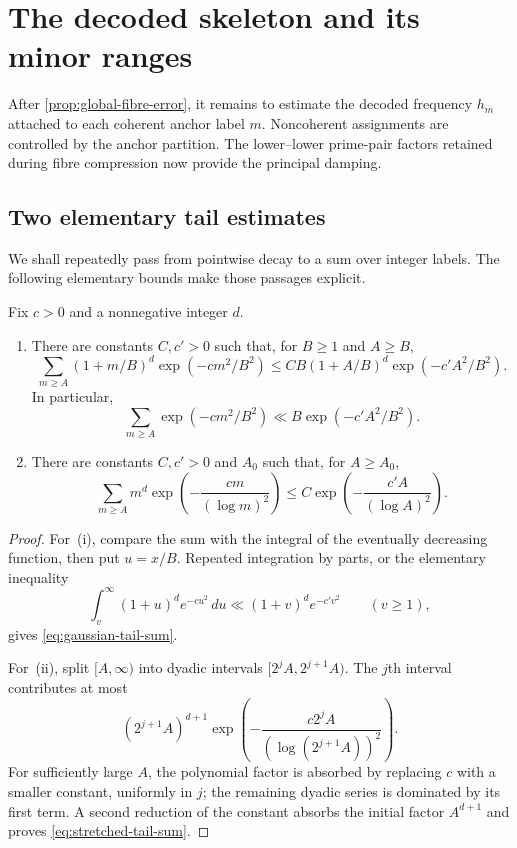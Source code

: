 \section{The decoded skeleton and its minor ranges}
\label{sec:decoded-skeleton}

After \cref{prop:global-fibre-error}, it remains to estimate the decoded frequency $h_m$ attached to each coherent anchor label $m$.  Noncoherent assignments are controlled by the anchor partition.  The lower--lower prime-pair factors retained during fibre compression now provide the principal damping.

\subsection{Two elementary tail estimates}

We shall repeatedly pass from pointwise decay to a sum over integer labels.  The following elementary bounds make those passages explicit.

\begin{lemma}
\label{lem:tail-summation}
Fix $c>0$ and a nonnegative integer $d$.
\begin{enumerate}[label=(\roman*)]
\item There are constants $C,c'>0$ such that, for $B\geq1$ and $A\geq B$,
\begin{equation}
\label{eq:gaussian-tail-sum}
 \sum_{m\geq A}(1+m/B)^d\exp(-cm^2/B^2)
 \leq CB(1+A/B)^d\exp(-c'A^2/B^2).
\end{equation}
In particular,
\[
 \sum_{m\geq A}\exp(-cm^2/B^2)
 \ll B\exp(-c'A^2/B^2).
\]
\item There are constants $C,c'>0$ and $A_0$ such that, for $A\geq A_0$,
\begin{equation}
\label{eq:stretched-tail-sum}
 \sum_{m\geq A}m^d\exp\left(-\frac{cm}{(\log m)^2}\right)
 \leq C\exp\left(-\frac{c'A}{(\log A)^2}\right).
\end{equation}
\end{enumerate}
\end{lemma}

\begin{proof}
For~(i), compare the sum with the integral of the eventually decreasing function, then put $u=x/B$.  Repeated integration by parts, or the elementary inequality
\[
 \int_v^\infty(1+u)^d e^{-cu^2}\,du
 \ll(1+v)^d e^{-c'v^2}
 \qquad(v\geq1),
\]
gives \cref{eq:gaussian-tail-sum}.

For~(ii), split $[A,\infty)$ into dyadic intervals $[2^jA,2^{j+1}A)$.  The $j$th interval contributes at most
\[
 (2^{j+1}A)^{d+1}
 \exp\left(-\frac{c2^jA}{(\log(2^{j+1}A))^2}\right).
\]
For sufficiently large $A$, the polynomial factor is absorbed by replacing $c$ with a smaller constant, uniformly in $j$; the remaining dyadic series is dominated by its first term.  A second reduction of the constant absorbs the initial factor $A^{d+1}$ and proves \cref{eq:stretched-tail-sum}.
\end{proof}

